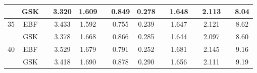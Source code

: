 \documentclass[aoas]{imsart}
\begin{document}
\begin{table}[htbp]
\begin{tabular}{cc c cc c cc c c c c c c}
	&	GSK	&&	3.320	&	1.609	&&	0.849	&	0.278	&&	1.648	&&	2.113	&&	8.04	\\
\midrule																	
35	&	EBF	&&	3.433	&	1.592	&&	0.755	&	0.239	&&	1.647	&&	2.121	&&	8.62	\\
	&	GSK	&&	3.378	&	1.668	&&	0.866	&	0.285	&&	1.644	&&	2.097	&&	8.60	\\
\midrule																	
40	&	EBF	&&	3.529	&	1.679	&&	0.791	&	0.252	&&	1.681	&&	2.145	&&	9.16	\\
	&	GSK	&&	3.418	&	1.690	&&	0.878	&	0.290	&&	1.656	&&	2.111	&&	9.19	\\
\bottomrule																	
	\end{tabular}
\end{table}


\end{document}
